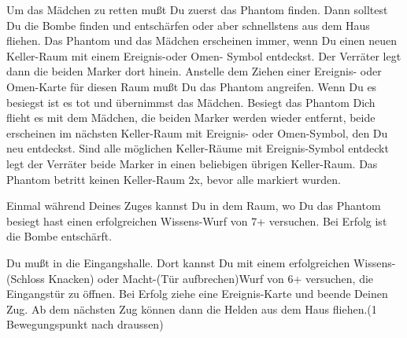 





Um das Mädchen zu retten mußt Du zuerst das Phantom finden. Dann solltest Du die Bombe finden und entschärfen oder aber schnellstens aus dem Haus fliehen.
Das Phantom und das Mädchen erscheinen immer, wenn Du einen neuen Keller-Raum mit einem Ereignis-oder Omen- Symbol entdeckst. Der Verräter legt dann die beiden Marker dort hinein.
Anstelle dem Ziehen einer Ereignis- oder Omen-Karte für diesen Raum mußt Du das Phantom angreifen. Wenn Du es besiegst ist es tot und übernimmst das Mädchen. Besiegt das Phantom Dich flieht es mit dem Mädchen, die beiden Marker werden wieder entfernt, beide erscheinen im nächsten Keller-Raum mit Ereignis- oder Omen-Symbol, den Du neu entdeckst.
Sind alle möglichen Keller-Räume mit Ereignis-Symbol entdeckt legt der Verräter beide Marker in einen beliebigen übrigen Keller-Raum. Das Phantom betritt keinen Keller-Raum 2x, bevor alle markiert wurden.

\newpage

Einmal während Deines Zuges kannst Du in dem Raum, wo Du das Phantom besiegt hast einen erfolgreichen Wissens-Wurf von 7+ versuchen. Bei Erfolg ist die Bombe entschärft.



Du mußt in die Eingangshalle. Dort kannst Du mit einem erfolgreichen Wissens-(Schloss Knacken) oder Macht-(Tür aufbrechen)Wurf von 6+ versuchen, die Eingangstür zu öffnen.
Bei Erfolg ziehe eine Ereignis-Karte und beende Deinen Zug.
Ab dem nächsten Zug können dann die Helden aus dem Haus fliehen.(1 Bewegungspunkt nach draussen)



